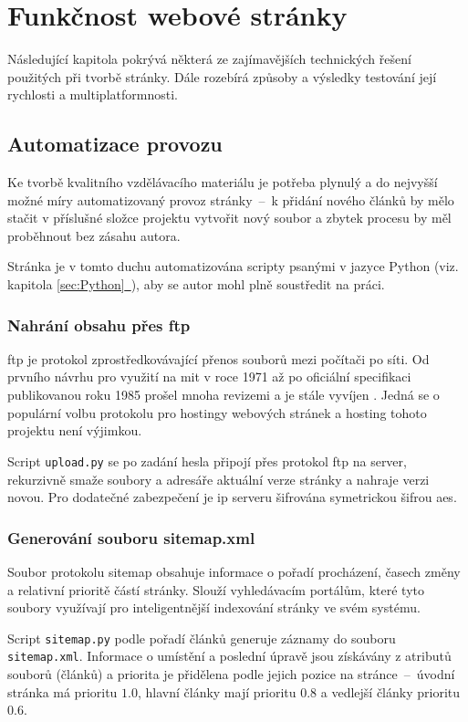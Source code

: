 \documentclass[a4paper, 12pt]{article}
\newcommand*{\fullref}[1]{\hyperref[{#1}]{\ref*{#1}~\nameref*{#1}}}
\begin{document}
  \section{Funkčnost webové stránky}
  Následující kapitola pokrývá některá ze zajímavějších technických řešení použitých při tvorbě stránky. Dále rozebírá způsoby a výsledky testování její rychlosti a multiplatformnosti.


  \subsection{Automatizace provozu} \label{sec:Automatizace provozu}
  Ke tvorbě kvalitního vzdělávacího materiálu je potřeba plynulý a do nejvyšší možné míry automatizovaný provoz stránky~--~k přidání nového článků by mělo stačit v příslušné složce projektu vytvořit nový soubor a zbytek procesu by měl proběhnout bez zásahu autora.

  Stránka je v tomto duchu automatizována scripty psanými v jazyce Python (viz. kapitola \fullref{sec:Python}), aby se autor mohl plně soustředit na práci.


  \subsubsection{Nahrání obsahu přes \acrshort{ftp}}
  \gls{ftp} je protokol zprostředkovávající přenos souborů mezi počítači po síti. Od prvního návrhu pro využití na \gls{mit} v roce 1971 až po oficiální specifikaci publikovanou roku 1985 prošel mnoha revizemi a je stále vyvíjen \cite{ftp-specification}. Jedná se o populární volbu protokolu pro hostingy webových stránek a hosting tohoto projektu není výjimkou.

  Script \texttt{upload.py} se po zadání hesla připojí přes protokol \gls{ftp} na server, rekurzivně smaže soubory a adresáře aktuální verze stránky a nahraje verzi novou. Pro dodatečné zabezpečení je \gls{ip} serveru šifrována symetrickou šifrou \gls{aes}.


  \subsubsection{Generování souboru sitemap.xml}
  Soubor protokolu sitemap obsahuje informace o pořadí procházení, časech změny a relativní prioritě částí stránky. Slouží vyhledávacím portálům, které tyto soubory využívají pro inteligentnější indexování stránky ve svém systému.

  Script \texttt{sitemap.py} podle pořadí článků generuje záznamy do souboru \texttt{sitemap.xml}. Informace o umístění a poslední úpravě jsou získávány z atributů souborů (článků) a priorita je přidělena podle jejich pozice na stránce~--~úvodní stránka má prioritu $1.0$, hlavní články mají prioritu $0.8$ a vedlejší články prioritu $0.6$.
\end{document}
